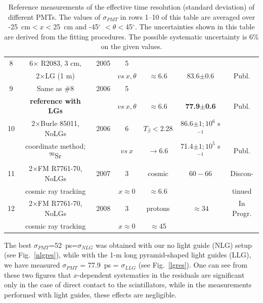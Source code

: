 \begin{table}[htbp]
\begin{center}
\begin{tabular}{|c|c|c|c|c|c|c|}
8 & 6$\times$ R2083, 3 cm,         & 2005 &5 &                  &                   &                \\
  & 2$\times$LG (1 m)              &      & $vs~x,\theta$  & $\approx$6.6     & 83.6$\pm$0.6       &\small{Publ.}   \\ \hline
9 & Same as \#8                    & 2006 &5 &                  &                    &                \\
  & \textbf{reference with LGs}    &      & $vs~x,\theta$  & $\approx$6.6     & \textbf{77.9$\pm$0.6}       &\small{Publ.}   \\  \hline
10& 2$\times$Burle 85011, NoLGs    & 2006 &6 & $T_{\beta}<2.28$ & 86.6$\pm 1;10^6$ s$^{-1}$ &              \\ 
  & coordinate method; $^{90}$Sr   &      & $vs~x$  & $\to$6.6         & 71.4$\pm 1;10^5$ s$^{-1}$ &\small{Publ.} \\ \hline
11& 2$\times$FM R7761-70, NoLGs    & 2007 &3 & cosmic           & $60-66$               &\small{Discon-}  \\ 
  & cosmic ray tracking            &      &$x\approx0$  & $\approx$6.6     &                &\small{tinued}       \\ \hline
12& 2$\times$FM R7761-70, NoLGs    & 2008 &3 & protons          & $\approx34$           & \small{In Progr.}  \\ 
  & cosmic ray tracking            &      & $x\approx0$ & $\approx$45      &                &              \\ \hline                  
\end{tabular}
\end{center}
\caption{\small{Reference measurements of the effective time resolution 
(standard deviation) of different PMTs.  The values of $\sigma_{PMT}$ in rows 
1--10 of this table are averaged over -25~cm$<x<$25~cm and 
-45$^\circ$ $< \theta <$45$^\circ$.  The uncertainties shown in this table 
are derived from the fitting procedures.  The possible systematic uncertainty 
is 6\% on the given values.}}
\label{crt}
\end{table}

The best $\sigma_{PMT}$=52~ps=$\sigma_{NLG}$ was obtained with our no light 
guide (NLG) setup (see Fig.~\ref{nlgres}), while with the 1-m long 
pyramid-shaped light guides (LLG), we have measured $\sigma_{PMT}$ = 77.9~ps 
= $\sigma_{LLG}$ (see Fig.~\ref{lgres}).  One can see from these two figures 
that $x$-dependent systematics in the residuals are significant only in the 
case of direct contact to the scintillators, while in the measurements performed 
with light guides, these effects are negligible. 

